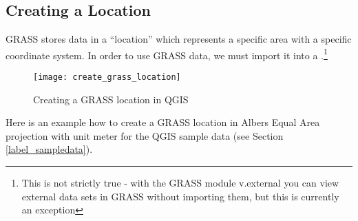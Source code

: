 \subsection{Creating a Location}\label{sec:create_loc}

GRASS stores data in a ``location'' which represents a specific area with a 
specific coordinate system. In order to use GRASS data, we must import it 
into a .\footnote{This is not strictly true - with the
GRASS module v.external you can view external data sets in GRASS without 
importing them, but this is currently an exception}

\begin{figure}[ht]
   \begin{center}
   \caption{Creating a GRASS location in QGIS \nixcaption}\label{fig:grass_location}\smallskip
   \texttt{[image: create\_grass\_location]}
\end{center}  
\end{figure}

Here is an example how to create a GRASS location in Albers Equal Area 
projection with unit meter for the QGIS sample data (see Section \ref{label_sampledata}). 

